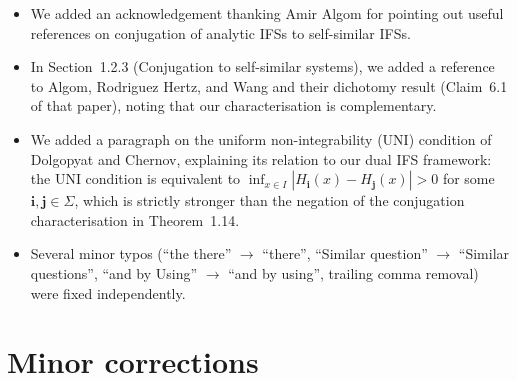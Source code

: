 \documentclass[11pt]{article}
\begin{document}
\begin{itemize}
  \item We added an acknowledgement thanking Amir Algom for pointing out useful references on conjugation of analytic IFSs to self-similar IFSs.

  \item In Section~1.2.3 (Conjugation to self-similar systems), we added a reference to Algom, Rodriguez Hertz, and Wang \cite{AlgomHertzWang23} and their dichotomy result (Claim~6.1 of that paper), noting that our characterisation is complementary.

  \item We added a paragraph on the uniform non-integrability (UNI) condition of Dolgopyat and Chernov, explaining its relation to our dual IFS framework: the UNI condition is equivalent to $\inf_{x\in I} |H_{\mathbf{i}}(x) - H_{\mathbf{j}}(x)| > 0$ for some $\mathbf{i},\mathbf{j}\in\Sigma$, which is strictly stronger than the negation of the conjugation characterisation in Theorem~1.14.

  \item Several minor typos (``the there'' $\to$ ``there'', ``Similar question'' $\to$ ``Similar questions'', ``and by Using'' $\to$ ``and by using'', trailing comma removal) were fixed independently.
\end{itemize}


\section*{Minor corrections}
\end{document}
